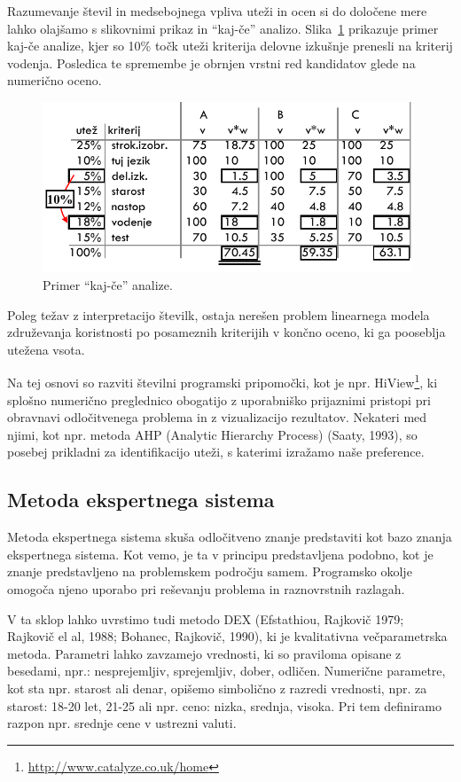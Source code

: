Razumevanje števil in medsebojnega vpliva uteži in ocen si do določene mere lahko olajšamo s slikovnimi prikaz in ``kaj-če'' analizo. Slika~\ref{f-kaj-ce} prikazuje primer kaj-če analize, kjer so 10\% točk uteži kriterija delovne izkušnje prenesli na kriterij vodenja. Posledica te spremembe je obrnjen vrstni red kandidatov glede na numerično oceno.

\begin{figure}[htbp]
\begin{center}
\includegraphics[width=11cm]{slike/kaj-ce.pdf}
\caption{Primer ``kaj-če'' analize.}
\label{f-kaj-ce}
\end{center}
\end{figure}

Poleg težav z interpretacijo številk, ostaja nerešen problem linearnega modela združevanja koristnosti po posameznih kriterijih v končno oceno, ki ga pooseblja utežena vsota.

Na tej osnovi so razviti številni programski pripomočki, kot je npr. HiView\footnote{\url{http://www.catalyze.co.uk/home}}, ki splošno numerično preglednico obogatijo z uporabniško prijaznimi pristopi pri obravnavi odločitvenega problema in z vizualizacijo rezultatov. Nekateri med njimi, kot npr. metoda AHP (Analytic Hierarchy Process) (Saaty, 1993), so posebej prikladni za identifikacijo uteži, s katerimi izražamo naše preference.

\subsection{Metoda ekspertnega sistema}

Metoda ekspertnega sistema skuša odločitveno znanje predstaviti kot bazo znanja ekspertnega sistema. Kot vemo, je ta v principu predstavljena podobno, kot je znanje predstavljeno na problemskem področju samem. Programsko okolje  omogoča njeno uporabo pri reševanju problema in raznovrstnih razlagah.

V ta sklop lahko uvrstimo tudi metodo DEX (Efstathiou, Rajkovič 1979; Rajkovič el al, 1988; Bohanec, Rajkovič, 1990), ki je kvalitativna večparametrska metoda. Parametri lahko zavzamejo vrednosti, ki so praviloma opisane z besedami, npr.: nesprejemljiv, sprejemljiv, dober, odličen. Numerične parametre, kot sta npr. starost ali denar, opišemo simbolično z razredi vrednosti, npr. za starost: 18-20 let, 21-25 ali npr. ceno: nizka, srednja, visoka. Pri tem definiramo razpon npr. srednje cene v ustrezni valuti. 

